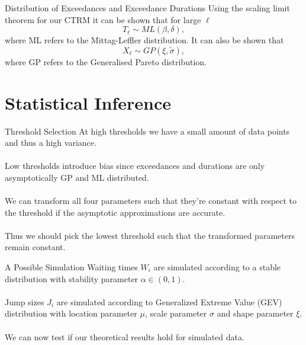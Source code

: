 \documentclass{beamer}
\begin{document}
\begin{frame}{Distribution of Exceedances and Exceedance Durations}
        Using the scaling limit theorem for our CTRM it can be shown that for large $\ell$
        \[
            T_\ell \sim ML(\beta,\delta),
        \]
	where ML refers to the Mittag-Leffler distribution. It can also be shown that
	\[
            X_\ell \sim GP(\xi,\tilde{\sigma}),
        \]
        where GP refers to the Generalised Pareto distribution.
\end{frame}

\section{Statistical Inference}

\begin{frame}{Threshold Selection}
At high thresholds we have a small amount of data points and thus a high variance.
\\~\\
Low thresholds introduce bias since exceedances and durations are only asymptotically GP and ML distributed.
\\~\\
We can transform all four parameters such that they're constant with respect to the threshold if the asymptotic approximations are accurate.
\\~\\
Thus we should pick the lowest threshold such that the transformed parameters remain constant.

\end{frame}

\begin{frame}{ A Possible Simulation }
	Waiting times $W_i$ are simulated according to a stable distribution with stability parameter $\alpha \in (0,1)$.
	\\~\\
	Jump sizes $J_i$ are simulated according to Generalized Extreme Value (GEV) distribution with location parameter $\mu$, scale parameter $\sigma$ and shape parameter $\xi$.
	\\~\\
	We can now test if our theoretical results hold for simulated data.
\end{frame}
\end{document}
